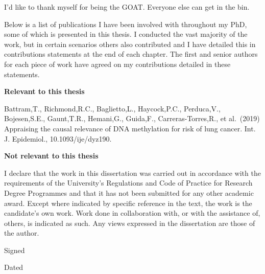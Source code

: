 \documentclass[11pt,oneside]{bristolthesis}
\begin{document}
  \begin{acknowledgements}
    I'd like to thank myself for being the GOAT. Everyone else can get in the bin.
  \end{acknowledgements}
  \begin{publications}
    Below is a list of publications I have been involved with throughout my PhD, some of which is presented in this thesis. I conducted the vast majority of the work, but in certain scenarios others also contributed and I have detailed this in contributions statements at the end of each chapter. The first and senior authors for each piece of work have agreed on my contributions detailed in these statements.

    \textbf{Relevant to this thesis}

    Battram,T., Richmond,R.C., Baglietto,L., Haycock,P.C., Perduca,V., Bojesen,S.E., Gaunt,T.R., Hemani,G., Guida,F., Carreras-Torres,R., et al.~(2019) Appraising the causal relevance of DNA methylation for risk of lung cancer. Int. J. Epidemiol., 10.1093/ije/dyz190.

    \textbf{Not relevant to this thesis}
  \end{publications}
  \begin{declaration}
    I declare that the work in this dissertation was carried out in accordance with the requirements of the University's Regulations and Code of Practice for Research Degree Programmes and that it has not been submitted for any other academic award. Except where indicated by specific reference in the text, the work is the candidate's own work. Work done in collaboration with, or with the assistance of, others, is indicated as such. Any views expressed in the dissertation are those of the author.

    \bigskip
    \bigskip
    \bigskip
    \bigskip
    \bigskip

    Signed

    \bigskip
    \bigskip
    \bigskip
    \bigskip
    \bigskip

    Dated
  \end{declaration}
  \hypersetup{linkcolor=black}
  {
  \setcounter{tocdepth}{2}
  \setcounter{secnumdepth}{2}
  \tableofcontents
  }
  \listoftables
  \listoffigures
\end{document}
